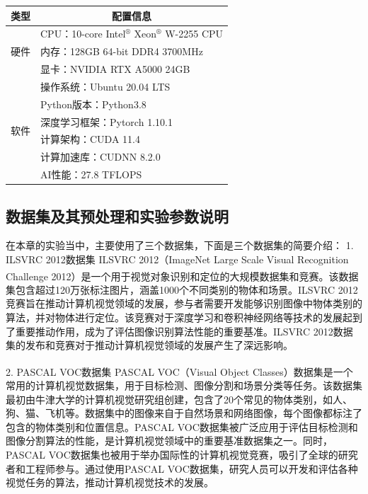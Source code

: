 \begin{table}
	\renewcommand{\arraystretch}{1.5}
\centering
{}
\label{tab:en}
	\begin{tabular}{p{4cm}p{8cm}} 
\hline
类型                  & \multicolumn{1}{c}{配置信息}      \\ 
\hline
\multirow{3}{*}{硬件} & CPU：10-core Intel$^\circledR$ Xeon$^\circledR$ W-2255 CPU                  \\
& 内存：128GB 64-bit DDR4 3700MHz  \\
& 显卡：NVIDIA RTX A5000 24GB      \\ 
\hline
\multirow{6}{*}{软件} & 操作系统：Ubuntu 20.04 LTS         \\
& Python版本：Python3.8            \\
& 深度学习框架：Pytorch 1.10.1         \\
& 计算架构：CUDA 11.4                \\
& 计算加速库：CUDNN 8.2.0             \\
& AI性能：27.8 TFLOPS              \\
\hline
\end{tabular}
\end{table}


\subsection{数据集及其预处理和实验参数说明}
在本章的实验当中，主要使用了三个数据集，下面是三个数据集的简要介绍：
1. ILSVRC 2012数据集
ILSVRC 2012（ImageNet Large Scale Visual Recognition Challenge 2012）\textsuperscript{\cite{ILSVRC}}是一个用于视觉对象识别和定位的大规模数据集和竞赛。该数据集包含超过120万张标注图片，涵盖1000个不同类别的物体和场景。ILSVRC 2012竞赛旨在推动计算机视觉领域的发展，参与者需要开发能够识别图像中物体类别的算法，并对物体进行定位。该竞赛对于深度学习和卷积神经网络等技术的发展起到了重要推动作用，成为了评估图像识别算法性能的重要基准。ILSVRC 2012数据集的发布和竞赛对于推动计算机视觉领域的发展产生了深远影响。

2. PASCAL VOC数据集
PASCAL VOC（Visual Object Classes）\textsuperscript{\cite{pascal}}数据集是一个常用的计算机视觉数据集，用于目标检测、图像分割和场景分类等任务。该数据集最初由牛津大学的计算机视觉研究组创建，包含了20个常见的物体类别，如人、狗、猫、飞机等。数据集中的图像来自于自然场景和网络图像，每个图像都标注了包含的物体类别和位置信息。PASCAL VOC数据集被广泛应用于评估目标检测和图像分割算法的性能，是计算机视觉领域中的重要基准数据集之一。同时，PASCAL VOC数据集也被用于举办国际性的计算机视觉竞赛，吸引了全球的研究者和工程师参与。通过使用PASCAL VOC数据集，研究人员可以开发和评估各种视觉任务的算法，推动计算机视觉技术的发展。

